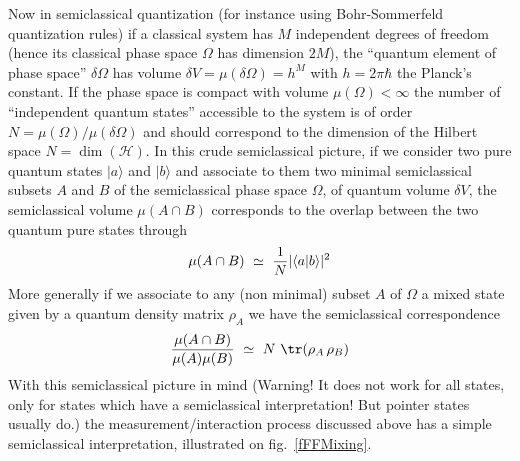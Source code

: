 Now in semiclassical quantization (for instance using Bohr-Sommerfeld quantization rules)  if a classical system has $M$ independent degrees of freedom (hence its classical phase space $\Omega$ has dimension $2M$), the ``quantum element of phase space'' $\delta\Omega$ has volume $\delta V=\mu(\delta\Omega)= h^{M}$ with $h=2\pi\hbar$ the Planck's constant.
If the phase space is compact with volume $\mu(\Omega)<\infty$ the number of ``independent quantum states'' accessible to the system is of order $N=\mu(\Omega)/\mu(\delta\Omega)$ and should correspond to the dimension of the Hilbert space $N=\dim(\mathcal{H})$.
In this crude semiclassical picture, if we consider two pure quantum states $|a\rangle$ and $|b\rangle$ and associate to them two minimal semiclassical subsets $A$ and $B$ of the semiclassical phase space $\Omega$, of quantum volume $\delta V$, the semiclassical volume $\mu(A\cap B)$ corresponds to the overlap between the two quantum pure states through
\begin{equation}
\label{ }
\mu(A\cap B)\  \simeq \ {1 \over N} | \langle a |b\rangle |^2
\end{equation}
More generally if we associate to any (non minimal) subset $A$ of $\Omega$ a mixed state given by a quantum density matrix $\rho_A$ we have the semiclassical correspondence
\begin{equation}
\label{ }
{\mu(A\cap B)\over \mu(A)\mu(B)}\  \simeq\  {N}\   \tr(\rho_A\, \rho_B)
\end{equation}
With this semiclassical picture in mind (Warning! It does not work for all states, only for states which have a semiclassical interpretation! But pointer states usually do.) the measurement/interaction process discussed above has a simple semiclassical interpretation, illustrated on fig.~\ref{fFFMixing}. 

